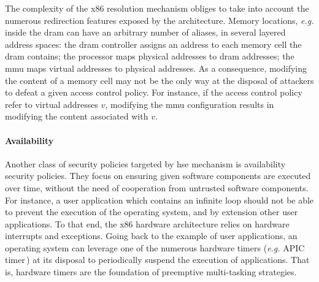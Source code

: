 %
%

The complexity of the x86 \IO resolution mechanism obliges to take into account
the numerous redirection features exposed by the architecture.
%
Memory locations, \emph{e.g.} inside the \ac{dram} can have an arbitrary number
of aliases, in several layered address spaces: the \ac{dram} controller assigns
an address to each memory cell the \ac{dram} contains; the processor maps
physical addresses to \ac{dram} addresses; the \ac{mmu} maps virtual addresses
to physical addresses.
%
As a consequence, modifying the content of a memory cell may not be the only way
at the disposal of attackers to defeat a given access control policy.
%
For instance, if the access control policy refer to virtual addresses \( v \),
modifying the \ac{mmu} configuration results in modifying the content associated
with \( v \).

\paragraph{Availability}
%
Another class of security policies targeted by \ac{hse} mechanism is
availability security policies.
%
They focus on ensuring given software components are executed over time, without
the need of cooperation from untrusted software components.
%
For instance, a user application which contains an infinite loop should not be
able to prevent the execution of the operating system, and by extension other
user applications.
%
To that end, the x86 hardware architecture relies on hardware interrupts and
exceptions.
%
Going back to the example of user applications, an operating system can leverage
one of the numerous hardware timers (\emph{e.g.} APIC timer\,\cite[Volume 3,
Subsection 10.5.4]{intel2014manual}) at its disposal to periodically suspend the
execution of applications.
%
That is, hardware timers are the foundation of preemptive multi-tasking
strategies.

